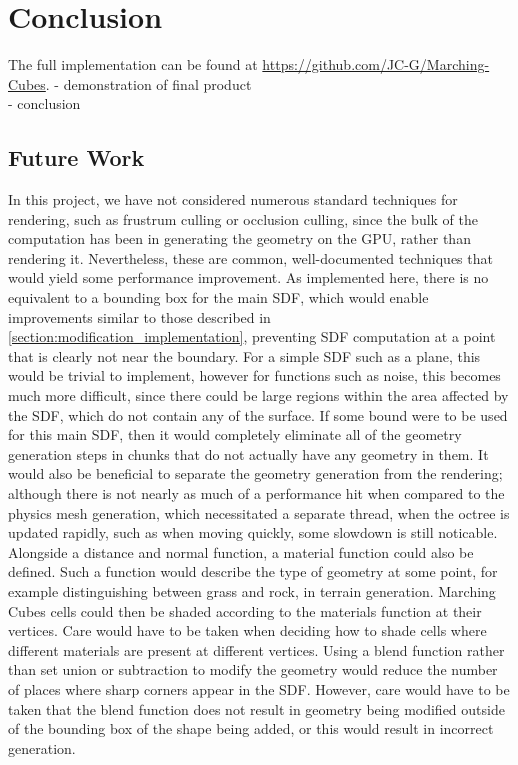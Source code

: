\documentclass{article}
\begin{document}
\section{Conclusion}
The full implementation can be found at \url{https://github.com/JC-G/Marching-Cubes}.
 - demonstration of final product\\
 - conclusion\\

\subsection{Future Work}
In this project, we have not considered numerous standard techniques for rendering, such as frustrum culling or occlusion culling, since the bulk of the computation has been in generating the geometry on the GPU, rather than rendering it. Nevertheless, these are common, well-documented techniques that would yield some performance improvement.
As implemented here, there is no equivalent to a bounding box for the main SDF, which would enable improvements similar to those described in \ref{section:modification_implementation}, preventing SDF computation at a point that is clearly not near the boundary. For a simple SDF such as a plane, this would be trivial to implement, however for functions such as noise, this becomes much more difficult, since there could be large regions within the area affected by the SDF, which do not contain any of the surface. If some bound were to be used for this main SDF, then it would completely eliminate all of the geometry generation steps in chunks that do not actually have any geometry in them.
It would also be beneficial to separate the geometry generation from the rendering; although there is not nearly as much of a performance hit when compared to the physics mesh generation, which necessitated a separate thread, when the octree is updated rapidly, such as when moving quickly, some slowdown is still noticable.
Alongside a distance and normal function, a material function could also be defined. Such a function would describe the type of geometry at some point, for example distinguishing between grass and rock, in terrain generation. Marching Cubes cells could then be shaded according to the materials function at their vertices. Care would have to be taken when deciding how to shade cells where different materials are present at different vertices.
Using a blend function rather than set union or subtraction to modify the geometry would reduce the number of places where sharp corners appear in the SDF. However, care would have to be taken that the blend function does not result in geometry being modified outside of the bounding box of the shape being added, or this would result in incorrect generation.



\end{document}

